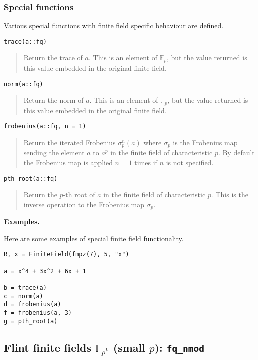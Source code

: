 \documentclass[a4paper,10pt]{article}
\newcommand{\F}{\mathbb{F}}
\newcommand{\code}{\lstinline}
\newcommand{\desc}[1]{\vspace{-3mm}\begin{quote}#1\end{quote}}
\begin{document}
{{\subsubsection{Special functions}

Various special functions with finite field specific behaviour are
defined.

\begin{lstlisting}
trace(a::fq)
\end{lstlisting}

\desc{Return the trace of $a$. This is an element of $\F_p$, but the value
returned is this value embedded in the original finite field.}

\begin{lstlisting}
norm(a::fq)
\end{lstlisting}

\desc{Return the norm of $a$. This is an element of $\F_p$, but the value
returned is this value embedded in the original finite field.}

\begin{lstlisting}
frobenius(a::fq, n = 1)
\end{lstlisting}

\desc{Return the iterated Frobenius $\sigma_p^n(a)$ where $\sigma_p$ is the 
Frobenius map sending the element $a$ to $a^p$ in the finite field of 
characteristic $p$. By default the Frobenius map is applied $n = 1$ times if
$n$ is not specified.}

\begin{lstlisting}
pth_root(a::fq)
\end{lstlisting}

\desc{Return the $p$-th root of $a$ in the finite field of characteristic
$p$. This is the inverse operation to the Frobenius map $\sigma_p$.}

\textbf{Examples.}

Here are some examples of special finite field functionality.

\begin{lstlisting}
R, x = FiniteField(fmpz(7), 5, "x")

a = x^4 + 3x^2 + 6x + 1

b = trace(a)
c = norm(a)
d = frobenius(a)
f = frobenius(a, 3)
g = pth_root(a)
\end{lstlisting}

\subsection{Flint finite fields $\F_{p^k}$ (small $p$): \code|fq_nmod|}

}}
\end{document}
